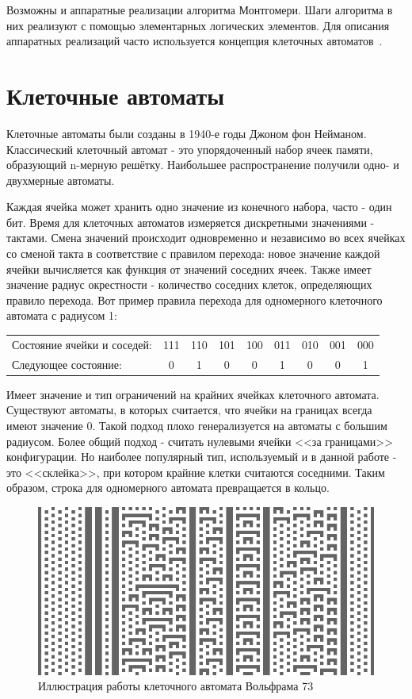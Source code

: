 \documentclass[times,specification,annotation]{itmo-student-thesis}
\begin{document}
Возможны и аппаратные реализации алгоритма Монтгомери.
Шаги алгоритма в них реализуют с помощью элементарных логических элементов.
Для описания аппаратных реализаций часто используется концепция клеточных автоматов~\cite{jeo07, ku04}.

\section{Клеточные автоматы}\label{sec:cells}

Клеточные автоматы были созданы в 1940-е годы Джоном фон Нейманом.
Классический клеточный автомат - это упорядоченный набор ячеек памяти, образующий n-мерную решётку.
Наибольшее распространение получили одно- и двухмерные автоматы.

Каждая ячейка может хранить одно значение из конечного набора, часто - один бит.
Время для клеточных автоматов измеряется дискретными значениями - тактами.
Смена значений происходит одновременно и независимо во всех ячейках со сменой такта в соответствие с правилом перехода:
новое значение каждой ячейки вычисляется как функция от значений соседних ячеек.
Также имеет значение радиус окрестности - количество соседних клеток, определяющих правило перехода.
Вот пример правила перехода для одномерного клеточного автомата с радиусом 1:
\begin{table}[h]
\begin{tabular}{ l l l l l l l l l }
Состояние ячейки и соседей: & 111 & 110 & 101 & 100 & 011 & 010 & 001 & 000 \\
Следующее состояние: & ~0 & ~1 & ~0 & ~0 & ~1 & ~0 & ~0 & ~1 \\
\end{tabular}
\end{table}

Имеет значение и тип ограничений на крайних ячейках клеточного автомата.
Существуют автоматы, в которых считается, что ячейки на границах всегда имеют значение 0.
Такой подход плохо генерализуется на автоматы с большим радиусом.
Более общий подход - считать нулевыми ячейки <<за границами>> конфигурации.
Но наиболее популярный тип, используемый и в данной работе - это <<склейка>>, при котором крайние клетки считаются соседними.
Таким образом, строка для одномерного автомата превращается в кольцо.

\begin{figure}[!h]
\caption{Иллюстрация работы клеточного автомата Вольфрама 73}\label{fig:wolf73}
\includegraphics[width=15cm]{graphics/rule73_r10.png}
\end{figure}
\end{document}
